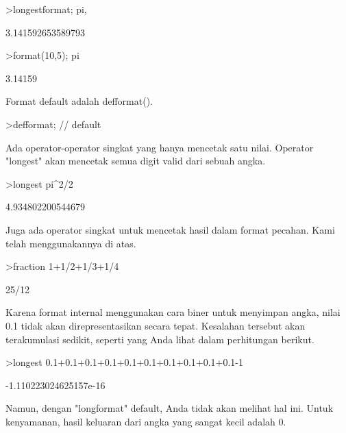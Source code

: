 \documentclass[12pt,arial,letterpaper]{book}
\begin{document}
\begin{eulerprompt}
>longestformat; pi,
\end{eulerprompt}
\begin{euleroutput}
  3.141592653589793
\end{euleroutput}
\begin{eulerprompt}
>format(10,5); pi
\end{eulerprompt}
\begin{euleroutput}
    3.14159 
\end{euleroutput}
\begin{eulercomment}
Format default adalah defformat().
\end{eulercomment}
\begin{eulerprompt}
>defformat; // default
\end{eulerprompt}
\begin{eulercomment}
Ada operator-operator singkat yang hanya mencetak satu nilai. Operator
"longest" akan mencetak semua digit valid dari sebuah angka.
\end{eulercomment}
\begin{eulerprompt}
>longest pi^2/2
\end{eulerprompt}
\begin{euleroutput}
        4.934802200544679 
\end{euleroutput}
\begin{eulercomment}
Juga ada operator singkat untuk mencetak hasil dalam format pecahan.
Kami telah menggunakannya di atas.
\end{eulercomment}
\begin{eulerprompt}
>fraction 1+1/2+1/3+1/4
\end{eulerprompt}
\begin{euleroutput}
  25/12
\end{euleroutput}
\begin{eulercomment}
Karena format internal menggunakan cara biner untuk menyimpan angka,
nilai 0.1 tidak akan direpresentasikan secara tepat. Kesalahan
tersebut akan terakumulasi sedikit, seperti yang Anda lihat dalam
perhitungan berikut.
\end{eulercomment}
\begin{eulerprompt}
>longest 0.1+0.1+0.1+0.1+0.1+0.1+0.1+0.1+0.1+0.1-1
\end{eulerprompt}
\begin{euleroutput}
   -1.110223024625157e-16 
\end{euleroutput}
\begin{eulercomment}
Namun, dengan "longformat" default, Anda tidak akan melihat hal ini.
Untuk kenyamanan, hasil keluaran dari angka yang sangat kecil adalah
0.
\end{eulercomment}
\end{document}
